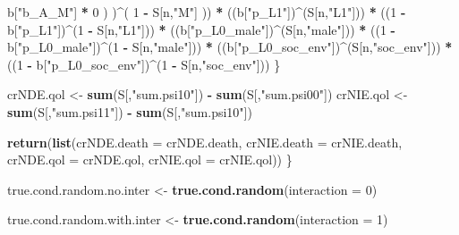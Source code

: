 \documentclass[
]{book}
\newenvironment{Shaded}{\begin{snugshade}}{\end{snugshade}}
\newcommand{\AttributeTok}[1]{\textcolor[rgb]{0.13,0.29,0.53}{#1}}
\newcommand{\DecValTok}[1]{\textcolor[rgb]{0.00,0.00,0.81}{#1}}
\newcommand{\FunctionTok}[1]{\textcolor[rgb]{0.13,0.29,0.53}{\textbf{#1}}}
\newcommand{\NormalTok}[1]{#1}
\newcommand{\OtherTok}[1]{\textcolor[rgb]{0.56,0.35,0.01}{#1}}
\newcommand{\SpecialCharTok}[1]{\textcolor[rgb]{0.81,0.36,0.00}{\textbf{#1}}}
\newcommand{\StringTok}[1]{\textcolor[rgb]{0.31,0.60,0.02}{#1}}
\begin{document}
\begin{Shaded}
\begin{Highlighting}[]
\NormalTok{                b[}\StringTok{"b\_A\_M"}\NormalTok{] }\SpecialCharTok{*} \DecValTok{0}\NormalTok{ ) )}\SpecialCharTok{\^{}}\NormalTok{( }\DecValTok{1} \SpecialCharTok{{-}}\NormalTok{ S[n,}\StringTok{"M"}\NormalTok{] )) }\SpecialCharTok{*}
\NormalTok{      ((b[}\StringTok{"p\_L1"}\NormalTok{])}\SpecialCharTok{\^{}}\NormalTok{(S[n,}\StringTok{"L1"}\NormalTok{])) }\SpecialCharTok{*}
\NormalTok{      ((}\DecValTok{1} \SpecialCharTok{{-}}\NormalTok{ b[}\StringTok{"p\_L1"}\NormalTok{])}\SpecialCharTok{\^{}}\NormalTok{(}\DecValTok{1} \SpecialCharTok{{-}}\NormalTok{ S[n,}\StringTok{"L1"}\NormalTok{])) }\SpecialCharTok{*}
\NormalTok{      ((b[}\StringTok{"p\_L0\_male"}\NormalTok{])}\SpecialCharTok{\^{}}\NormalTok{(S[n,}\StringTok{"male"}\NormalTok{])) }\SpecialCharTok{*} 
\NormalTok{      ((}\DecValTok{1} \SpecialCharTok{{-}}\NormalTok{ b[}\StringTok{"p\_L0\_male"}\NormalTok{])}\SpecialCharTok{\^{}}\NormalTok{(}\DecValTok{1} \SpecialCharTok{{-}}\NormalTok{ S[n,}\StringTok{"male"}\NormalTok{])) }\SpecialCharTok{*} 
\NormalTok{      ((b[}\StringTok{"p\_L0\_soc\_env"}\NormalTok{])}\SpecialCharTok{\^{}}\NormalTok{(S[n,}\StringTok{"soc\_env"}\NormalTok{])) }\SpecialCharTok{*}
\NormalTok{      ((}\DecValTok{1} \SpecialCharTok{{-}}\NormalTok{ b[}\StringTok{"p\_L0\_soc\_env"}\NormalTok{])}\SpecialCharTok{\^{}}\NormalTok{(}\DecValTok{1} \SpecialCharTok{{-}}\NormalTok{ S[n,}\StringTok{"soc\_env"}\NormalTok{])) }
\NormalTok{    \}}
  
\NormalTok{  crNDE.qol }\OtherTok{\textless{}{-}} \FunctionTok{sum}\NormalTok{(S[,}\StringTok{"sum.psi10"}\NormalTok{]) }\SpecialCharTok{{-}} \FunctionTok{sum}\NormalTok{(S[,}\StringTok{"sum.psi00"}\NormalTok{])}
\NormalTok{  crNIE.qol }\OtherTok{\textless{}{-}} \FunctionTok{sum}\NormalTok{(S[,}\StringTok{"sum.psi11"}\NormalTok{]) }\SpecialCharTok{{-}} \FunctionTok{sum}\NormalTok{(S[,}\StringTok{"sum.psi10"}\NormalTok{])}
  
  \FunctionTok{return}\NormalTok{(}\FunctionTok{list}\NormalTok{(}\AttributeTok{crNDE.death =}\NormalTok{ crNDE.death, }\AttributeTok{crNIE.death =}\NormalTok{ crNIE.death, }
              \AttributeTok{crNDE.qol =}\NormalTok{ crNDE.qol, }\AttributeTok{crNIE.qol =}\NormalTok{ crNIE.qol))}
\NormalTok{\}}
\end{Highlighting}
\end{Shaded}

\begin{Shaded}
\begin{Highlighting}[]
\NormalTok{true.cond.random.no.inter }\OtherTok{\textless{}{-}} \FunctionTok{true.cond.random}\NormalTok{(}\AttributeTok{interaction =} \DecValTok{0}\NormalTok{)}

\NormalTok{true.cond.random.with.inter }\OtherTok{\textless{}{-}} \FunctionTok{true.cond.random}\NormalTok{(}\AttributeTok{interaction =} \DecValTok{1}\NormalTok{)}
\end{Highlighting}
\end{Shaded}
\end{document}
